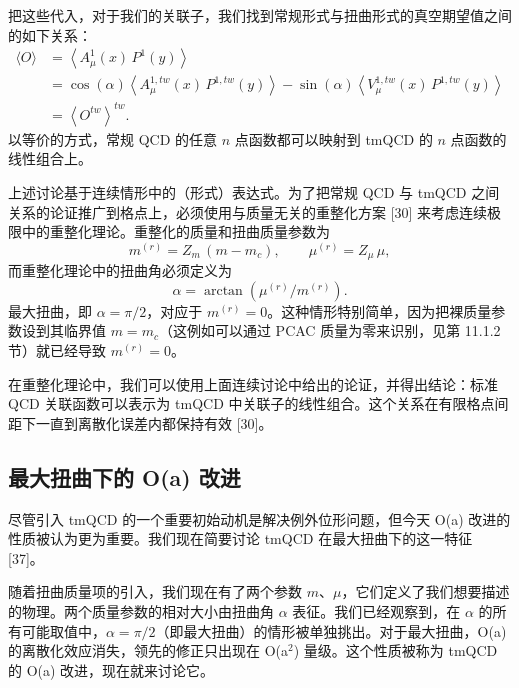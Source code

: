 把这些代入，对于我们的关联子，我们找到常规形式与扭曲形式的真空期望值之间的如下关系：
\begin{equation}
  \begin{split}
    \langle O\rangle
    &= \left\langle A^1_\mu(x)\,P^1(y)\right\rangle \\
    &= \cos(\alpha)\left\langle A^{1,tw}_\mu(x)\,P^{1,tw}(y)\right\rangle
    - \sin(\alpha)\left\langle V^{1,tw}_\mu(x)\,P^{1,tw}(y)\right\rangle \\
    &= \left\langle O^{tw}\right\rangle^{tw} .
  \end{split}
\end{equation}
以等价的方式，常规 QCD 的任意 $n$ 点函数都可以映射到 tmQCD 的 $n$ 点函数的线性组合上。

上述讨论基于连续情形中的（形式）表达式。为了把常规 QCD 与 tmQCD 之间关系的论证推广到格点上，必须使用与质量无关的重整化方案 [30] 来考虑连续极限中的重整化理论。重整化的质量和扭曲质量参数为
\begin{equation}
  m^{(r)} = Z_m\,(m - m_c) , \qquad \mu^{(r)} = Z_\mu\,\mu ,
\end{equation}
而重整化理论中的扭曲角必须定义为
\begin{equation}
  \alpha = \arctan\left(\mu^{(r)}/m^{(r)}\right) .
\end{equation}
最大扭曲，即 $\alpha = \pi/2$，对应于 $m^{(r)} = 0$。这种情形特别简单，因为把裸质量参数设到其临界值 $m = m_c$（这例如可以通过 PCAC 质量为零来识别，见第 11.1.2 节）就已经导致 $m^{(r)} = 0$。

在重整化理论中，我们可以使用上面连续讨论中给出的论证，并得出结论：标准 QCD 关联函数可以表示为 tmQCD 中关联子的线性组合。这个关系在有限格点间距下一直到离散化误差内都保持有效 [30]。

\subsection{最大扭曲下的 O(a) 改进}

尽管引入 tmQCD 的一个重要初始动机是解决例外位形问题，但今天 O(a) 改进的性质被认为更为重要。我们现在简要讨论 tmQCD 在最大扭曲下的这一特征 [37]。

随着扭曲质量项的引入，我们现在有了两个参数 $m$、$\mu$，它们定义了我们想要描述的物理。两个质量参数的相对大小由扭曲角 $\alpha$ 表征。我们已经观察到，在 $\alpha$ 的所有可能取值中，$\alpha = \pi/2$（即最大扭曲）的情形被单独挑出。对于最大扭曲，O(a) 的离散化效应消失，领先的修正只出现在 O(a$^2$) 量级。这个性质被称为 tmQCD 的 O(a) 改进，现在就来讨论它。

